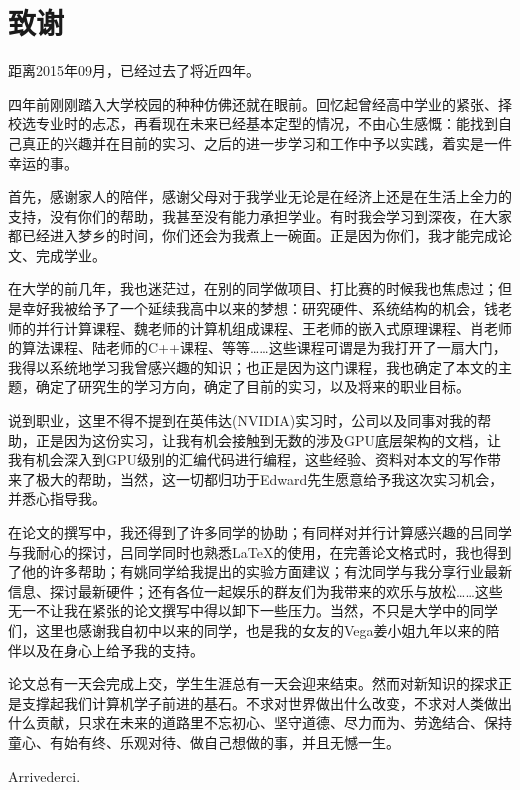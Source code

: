 \clearpage                              %
\section*{致谢}                         %
\par 距离2015年09月，已经过去了将近四年。
\par 四年前刚刚踏入大学校园的种种仿佛还就在眼前。回忆起曾经高中学业的紧张、择校选专业时的忐忑，再看现在未来已经基本定型的情况，不由心生感慨：能找到自己真正的兴趣并在目前的实习、之后的进一步学习和工作中予以实践，着实是一件幸运的事。
\par 首先，感谢家人的陪伴，感谢父母对于我学业无论是在经济上还是在生活上全力的支持，没有你们的帮助，我甚至没有能力承担学业。有时我会学习到深夜，在大家都已经进入梦乡的时间，你们还会为我煮上一碗面。正是因为你们，我才能完成论文、完成学业。
\par 在大学的前几年，我也迷茫过，在别的同学做项目、打比赛的时候我也焦虑过；但是幸好我被给予了一个延续我高中以来的梦想：研究硬件、系统结构的机会，钱老师的并行计算课程、魏老师的计算机组成课程、王老师的嵌入式原理课程、肖老师的算法课程、陆老师的C++课程、等等……这些课程可谓是为我打开了一扇大门，我得以系统地学习我曾感兴趣的知识；也正是因为这门课程，我也确定了本文的主题，确定了研究生的学习方向，确定了目前的实习，以及将来的职业目标。
\par 说到职业，这里不得不提到在英伟达(NVIDIA)实习时，公司以及同事对我的帮助，正是因为这份实习，让我有机会接触到无数的涉及GPU底层架构的文档，让我有机会深入到GPU级别的汇编代码进行编程，这些经验、资料对本文的写作带来了极大的帮助，当然，这一切都归功于Edward先生愿意给予我这次实习机会，并悉心指导我。
\par 在论文的撰写中，我还得到了许多同学的协助；有同样对并行计算感兴趣的吕同学与我耐心的探讨，吕同学同时也熟悉\LaTeX 的使用，在完善论文格式时，我也得到了他的许多帮助；有姚同学给我提出的实验方面建议；有沈同学与我分享行业最新信息、探讨最新硬件；还有各位一起娱乐的群友们为我带来的欢乐与放松……这些无一不让我在紧张的论文撰写中得以卸下一些压力。当然，不只是大学中的同学们，这里也感谢我自初中以来的同学，也是我的女友的Vega姜小姐九年以来的陪伴以及在身心上给予我的支持。
\par 论文总有一天会完成上交，学生生涯总有一天会迎来结束。然而对新知识的探求正是支撑起我们计算机学子前进的基石。不求对世界做出什么改变，不求对人类做出什么贡献，只求在未来的道路里不忘初心、坚守道德、尽力而为、劳逸结合、保持童心、有始有终、乐观对待、做自己想做的事，并且无憾一生。
\par Arrivederci.
